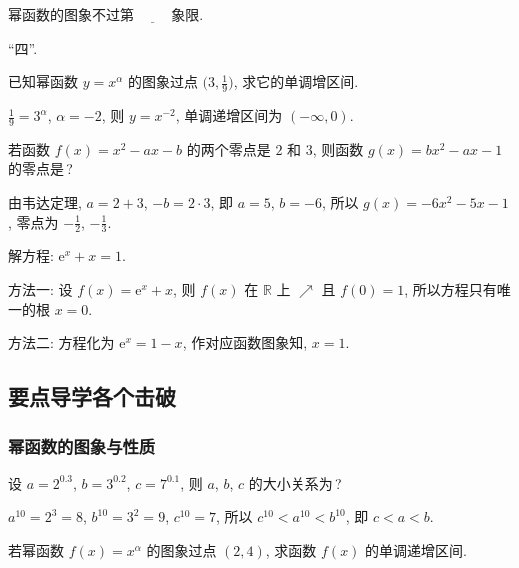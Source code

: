   \lianxi
  \begin{exercise}
    幂函数的图象不过第 $\underline{\qquad}$ 象限.
  \end{exercise}

  \beginsolution
    ``四''.
  \endsolution
  
  \begin{exercise}
    已知幂函数 $y=x^\alpha$ 的图象过点 $\Big(3, \frac19\Big)$,
    求它的单调增区间.
  \end{exercise}

  \beginsolution
    $\frac19=3^\alpha$, $\alpha=-2$, 则 $y=x^{-2}$, 单调递增区间为 $(-\infty,0)$.
  \endsolution
  
  \begin{exercise}
    若函数 $f(x)=x^2 -ax-b$ 的两个零点是 $2$ 和 $3$, 
    则函数 $g(x)=bx^2 -ax-1$ 的零点是\,?
  \end{exercise}

  \beginsolution
    由韦达定理, $a=2+3$, $-b=2\cdot 3$, 
    即 $a=5$, $b=-6$, 所以 $g(x)=-6x^2-5x-1$, 零点为 $-\frac12$, $-\frac13$.
  \endsolution
  
  \begin{exercise}
    解方程: $\mathrm{e}^x+x=1$.
  \end{exercise}

  \beginsolution
    方法一: 设 $f(x)=\mathrm{e}^x+x$, 则 $f(x)$ 在 $\mathbb{R}$ 上 $\nearrow$ 且 $f(0)=1$, 所以方程只有唯一的根 $x=0$.
    
    方法二: 方程化为 $\mathrm{e}^x=1-x$, 作对应函数图象知, $x=1$.
  \endsolution
  
  \subsection{要点导学\quad 各个击破}
  \subsubsection{幂函数的图象与性质}
  \begin{example}
    设 $a=2^{0.3}$, $b=3^{0.2}$, $c=7^{0.1}$, 则 $a$, $b$, $c$ 
    的大小关系为\,?
  \end{example}

  \beginsolution
    $a^{10}=2^3=8$, $b^{10}=3^2=9$, $c^{10}=7$, 所以 $c^{10}<a^{10}<b^{10}$, 即 $c<a<b$.
  \endsolution
  
  \lianxi
  \begin{exercise}[s]
    若幂函数 $f(x)=x^\alpha$ 的图象过点 $(2,4)$, 求函数 $f(x)$ 的单调递增区间.
  \end{exercise}

